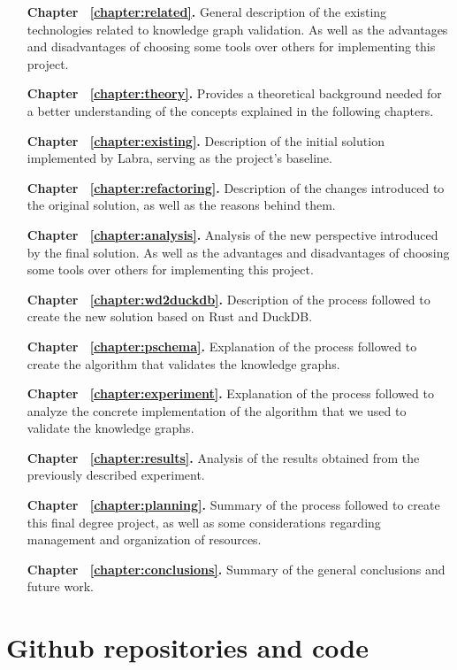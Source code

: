 \begin{itemize}
    \itemsep0.25em
    \item[\textbf{Chapter ~\ref{chapter:related}.}] General description of the existing technologies related to knowledge graph validation. As well as the advantages and disadvantages of choosing some tools over others for implementing this project.
    \item[\textbf{Chapter ~\ref{chapter:theory}.}] Provides a theoretical background needed for a better understanding of the concepts explained in the following chapters.
    \item[\textbf{Chapter ~\ref{chapter:existing}.}] Description of the initial solution implemented by Labra, serving as the project's baseline.
    \item[\textbf{Chapter ~\ref{chapter:refactoring}.}] Description of the changes introduced to the original solution, as well as the reasons behind them.
    \item[\textbf{Chapter ~\ref{chapter:analysis}.}] Analysis of the new perspective introduced by the final solution. As well as the advantages and disadvantages of choosing some tools over others for implementing this project.
    \item[\textbf{Chapter ~\ref{chapter:wd2duckdb}.}] Description of the process followed to create the new solution based on Rust and DuckDB.
    \item[\textbf{Chapter ~\ref{chapter:pschema}.}] Explanation of the process followed to create the algorithm that validates the knowledge graphs.
    \item[\textbf{Chapter ~\ref{chapter:experiment}.}] Explanation of the process followed to analyze the concrete implementation of the algorithm that we used to validate the knowledge graphs.
    \item[\textbf{Chapter ~\ref{chapter:results}.}] Analysis of the results obtained from the previously described experiment.
    \item[\textbf{Chapter ~\ref{chapter:planning}.}] Summary of the process followed to create this final degree project, as well as some considerations regarding management and organization of resources.
    \item[\textbf{Chapter ~\ref{chapter:conclusions}.}] Summary of the general conclusions and future work.
\end{itemize}

\section{Github repositories and code}


